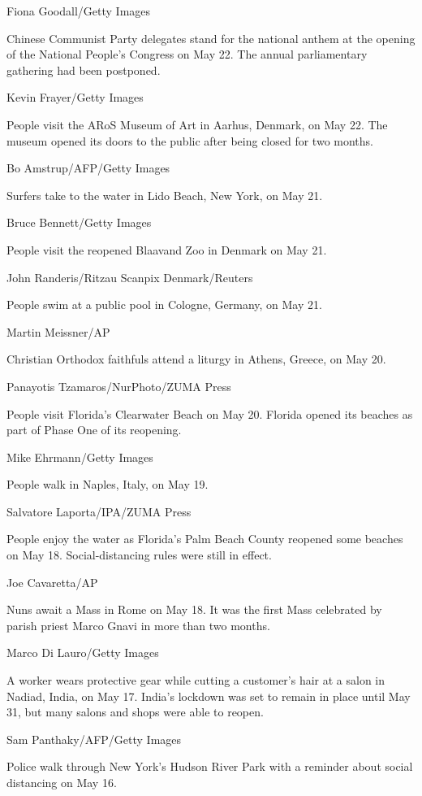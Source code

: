 Fiona Goodall/Getty Images

Chinese Communist Party delegates stand for the national anthem at the
opening of the National People's Congress on May 22. The annual
parliamentary gathering had been postponed.

Kevin Frayer/Getty Images

People visit the ARoS Museum of Art in Aarhus, Denmark, on May 22. The
museum opened its doors to the public after being closed for two months.

Bo Amstrup/AFP/Getty Images

Surfers take to the water in Lido Beach, New York, on May 21.

Bruce Bennett/Getty Images

People visit the reopened Blaavand Zoo in Denmark on May 21.

John Randeris/Ritzau Scanpix Denmark/Reuters

People swim at a public pool in Cologne, Germany, on May 21.

Martin Meissner/AP

Christian Orthodox faithfuls attend a liturgy in Athens, Greece, on May
20.

Panayotis Tzamaros/NurPhoto/ZUMA Press

People visit Florida's Clearwater Beach on May 20. Florida opened its
beaches as part of Phase One of its reopening.

Mike Ehrmann/Getty Images

People walk in Naples, Italy, on May 19.

Salvatore Laporta/IPA/ZUMA Press

People enjoy the water as Florida's Palm Beach County reopened some
beaches on May 18. Social-distancing rules were still in effect.

Joe Cavaretta/AP

Nuns await a Mass in Rome on May 18. It was the first Mass celebrated by
parish priest Marco Gnavi in more than two months.

Marco Di Lauro/Getty Images

A worker wears protective gear while cutting a customer's hair at a
salon in Nadiad, India, on May 17. India's lockdown was set to remain in
place until May 31, but many salons and shops were able to reopen.

Sam Panthaky/AFP/Getty Images

Police walk through New York's Hudson River Park with a reminder about
social distancing on May 16.

